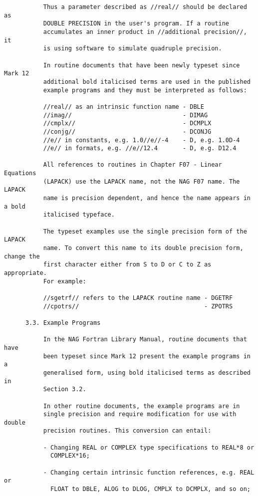 \begin{small}
\begin{verbatim}
           Thus a parameter described as //real// should be declared as
           DOUBLE PRECISION in the user's program. If a routine
           accumulates an inner product in //additional precision//, it
           is using software to simulate quadruple precision.

           In routine documents that have been newly typeset since Mark 12
           additional bold italicised terms are used in the published
           example programs and they must be interpreted as follows:

           //real// as an intrinsic function name - DBLE
           //imag//                               - DIMAG
           //cmplx//                              - DCMPLX
           //conjg//                              - DCONJG
           //e// in constants, e.g. 1.0//e//-4    - D, e.g. 1.0D-4
           //e// in formats, e.g. //e//12.4       - D, e.g. D12.4

           All references to routines in Chapter F07 - Linear Equations
           (LAPACK) use the LAPACK name, not the NAG F07 name. The LAPACK
           name is precision dependent, and hence the name appears in a bold
           italicised typeface.

           The typeset examples use the single precision form of the LAPACK
           name. To convert this name to its double precision form, change the
           first character either from S to D or C to Z as appropriate.
           For example:

           //sgetrf// refers to the LAPACK routine name - DGETRF
           //cpotrs//                                   - ZPOTRS

      3.3. Example Programs

           In the NAG Fortran Library Manual, routine documents that have
           been typeset since Mark 12 present the example programs in a
           generalised form, using bold italicised terms as described in
           Section 3.2.

           In other routine documents, the example programs are in
           single precision and require modification for use with double
           precision routines. This conversion can entail:

           - Changing REAL or COMPLEX type specifications to REAL*8 or
             COMPLEX*16;

           - Changing certain intrinsic function references, e.g. REAL or
             FLOAT to DBLE, ALOG to DLOG, CMPLX to DCMPLX, and so on;


\end{verbatim}
\end{small}
